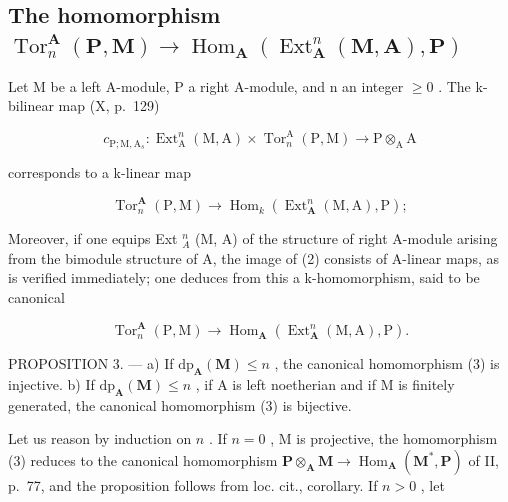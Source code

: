 \subsection{\texorpdfstring{The homomorphism \(\operatorname{Tor}_n^{\mathbf{A}}(\mathbf{P},\mathbf{M})\to \operatorname{Hom}_{\mathbf{A}}(\operatorname{Ext}_{\mathbf{A}}^{n}(\mathbf{M},\mathbf{A}),\mathbf{P})\)}{The homomorphism \textbackslash operatorname\{Tor\}\_n\^{}\{\textbackslash mathbf\{A\}\}(\textbackslash mathbf\{P\},\textbackslash mathbf\{M\})\textbackslash to \textbackslash operatorname\{Hom\}\_\{\textbackslash mathbf\{A\}\}(\textbackslash operatorname\{Ext\}\_\{\textbackslash mathbf\{A\}\}\^{}\{n\}(\textbackslash mathbf\{M\},\textbackslash mathbf\{A\}),\textbackslash mathbf\{P\})}}

Let M be a left A-module, P a right A-module, and n an integer \(\geqslant 0\) . The k-bilinear map (X, p.~129)

\[
c _ {\mathrm{P}; \mathrm{M}, \mathrm{A} _ {s}}: \operatorname{Ext} _ {\mathrm{A}} ^ {n} (\mathrm{M}, \mathrm{A}) \times \operatorname{Tor} _ {n} ^ {\mathrm{A}} (\mathrm{P}, \mathrm{M}) \rightarrow \mathrm{P} \otimes_ {\mathrm{A}} \mathrm{A}
\]

corresponds to a k-linear map

\[
\operatorname{Tor} _ {n} ^ {\mathbf {A}} (\mathrm{P}, \mathrm{M}) \rightarrow \operatorname{Hom} _ {k} \left(\operatorname{Ext} _ {\mathbf {A}} ^ {n} (\mathrm{M}, \mathrm{A}), \mathrm{P}\right);\tag{2}
\]

Moreover, if one equips Ext \(_{A}^{n}\) (M, A) of the structure of right A-module arising from the bimodule structure of A, the image of (2) consists of A-linear maps, as is verified immediately; one deduces from this a k-homomorphism, said to be canonical

\[
\operatorname{Tor} _ {n} ^ {\mathbf {A}} (\mathrm{P}, \mathrm{M}) \rightarrow \operatorname{Hom} _ {\mathbf {A}} \left(\operatorname{Ext} _ {\mathbf {A}} ^ {n} (\mathrm{M}, \mathrm{A}), \mathrm{P}\right).\tag{3}
\]

PROPOSITION 3. --- a) If \(\mathrm{dp}_{\mathbf{A}}(\mathbf{M}) \leqslant n\) , the canonical homomorphism (3) is injective. b) If \(\mathrm{dp}_{\mathbf{A}}(\mathbf{M}) \leqslant n\) , if A is left noetherian and if M is finitely generated, the canonical homomorphism (3) is bijective.

Let us reason by induction on \(n\) . If \(n = 0\) , M is projective, the homomorphism (3) reduces to the canonical homomorphism \(\mathbf{P} \otimes_{\mathbf{A}} \mathbf{M} \to \operatorname{Hom}_{\mathbf{A}} (\mathbf{M}^{*}, \mathbf{P})\) of II, p.~77, and the proposition follows from loc. cit., corollary. If \(n > 0\) , let

